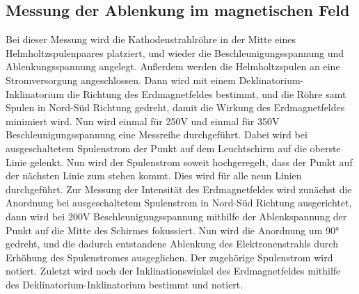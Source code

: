 \subsection{Messung der Ablenkung im magnetischen Feld}
Bei dieser Messung wird die Kathodenstrahlröhre in der Mitte eines Helmholtzspulenpaares platziert, und wieder die Beschleunigungsspannung und Ablenkungsspannung
angelegt. Außerdem werden die Helmholtzspulen an eine Stromversorgung angeschlossen. Dann wird mit einem Deklinatorium-Inklinatorium die Richtung des Erdmagnetfeldes
bestimmt, und die Röhre samt Spulen in Nord-Süd Richtung gedreht, damit die Wirkung des Erdmagnetfeldes minimiert wird.
Nun wird einmal für 250V und einmal für 350V Beschleunigungsspannung eine Messreihe durchgeführt. Dabei wird bei ausgeschaltetem Spulenstrom der Punkt auf dem
Leuchtschirm auf die oberste Linie gelenkt. Nun wird der Spulenstrom soweit hochgeregelt, dass der Punkt auf der nächsten Linie zum stehen kommt. Dies wird für alle
neun Linien durchgeführt. Zur Messung der Intensität des Erdmagnetfeldes wird zunächst die Anordnung bei ausgeschaltetem Spulenstrom in Nord-Süd Richtung ausgerichtet,
dann wird bei 200V Beschleunigungsspannung mithilfe der Ablenkspannung der Punkt auf die Mitte des Schirmes fokussiert. Nun wird die Anordnung um 90° gedreht, und die
dadurch entstandene Ablenkung des Elektronenstrahls durch Erhöhung des Spulenstromes ausgeglichen. Der zugehörige Spulenstrom wird notiert. Zuletzt wird noch der
Inklinationswinkel des Erdmagnetfeldes mithilfe des Deklinatorium-Inklinatorium bestimmt und notiert.
